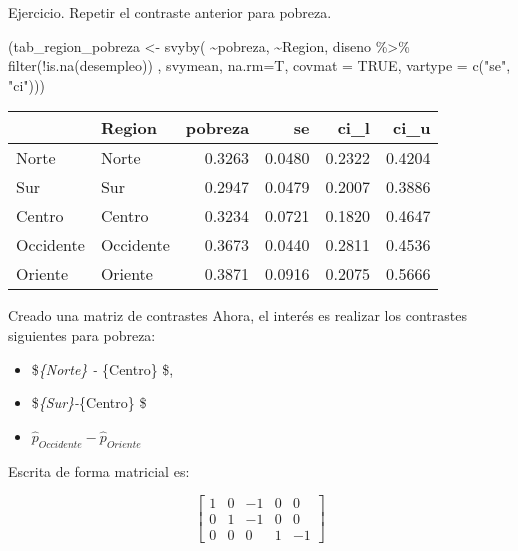 \documentclass[
  ignorenonframetext,
]{beamer}
\newenvironment{Shaded}{\begin{snugshade}}{\end{snugshade}}
\newcommand{\AttributeTok}[1]{\textcolor[rgb]{0.77,0.63,0.00}{#1}}
\newcommand{\ConstantTok}[1]{\textcolor[rgb]{0.00,0.00,0.00}{#1}}
\newcommand{\FunctionTok}[1]{\textcolor[rgb]{0.00,0.00,0.00}{#1}}
\newcommand{\NormalTok}[1]{#1}
\newcommand{\OtherTok}[1]{\textcolor[rgb]{0.56,0.35,0.01}{#1}}
\newcommand{\SpecialCharTok}[1]{\textcolor[rgb]{0.00,0.00,0.00}{#1}}
\newcommand{\StringTok}[1]{\textcolor[rgb]{0.31,0.60,0.02}{#1}}
\providecommand{\tightlist}{%
  \setlength{\itemsep}{0pt}\setlength{\parskip}{0pt}}
\begin{document}
\begin{frame}[fragile]{Ejercicio.}
\protect\hypertarget{ejercicio.}{}
Repetir el contraste anterior para pobreza.

\begin{Shaded}
\begin{Highlighting}[]
\NormalTok{(tab\_region\_pobreza }\OtherTok{\textless{}{-}} \FunctionTok{svyby}\NormalTok{(}
  \SpecialCharTok{\textasciitilde{}}\NormalTok{pobreza, }\SpecialCharTok{\textasciitilde{}}\NormalTok{Region, }
\NormalTok{    diseno }\SpecialCharTok{\%\textgreater{}\%} \FunctionTok{filter}\NormalTok{(}\SpecialCharTok{!}\FunctionTok{is.na}\NormalTok{(desempleo)) , }
\NormalTok{     svymean, }\AttributeTok{na.rm=}\NormalTok{T, }\AttributeTok{covmat =} \ConstantTok{TRUE}\NormalTok{,}
      \AttributeTok{vartype =} \FunctionTok{c}\NormalTok{(}\StringTok{"se"}\NormalTok{, }\StringTok{"ci"}\NormalTok{)))}
\end{Highlighting}
\end{Shaded}

\begin{tabular}{l|l|r|r|r|r}
\hline
  & Region & pobreza & se & ci\_l & ci\_u\\
\hline
Norte & Norte & 0.3263 & 0.0480 & 0.2322 & 0.4204\\
\hline
Sur & Sur & 0.2947 & 0.0479 & 0.2007 & 0.3886\\
\hline
Centro & Centro & 0.3234 & 0.0721 & 0.1820 & 0.4647\\
\hline
Occidente & Occidente & 0.3673 & 0.0440 & 0.2811 & 0.4536\\
\hline
Oriente & Oriente & 0.3871 & 0.0916 & 0.2075 & 0.5666\\
\hline
\end{tabular}
\end{frame}

\begin{frame}{Creado una matriz de contrastes}
\protect\hypertarget{creado-una-matriz-de-contrastes-1}{}
Ahora, el interés es realizar los contrastes siguientes para pobreza:

\begin{itemize}[<+->]
\tightlist
\item
  \$\emph{\{Norte\} - }\{Centro\} \$,
\item
  \$\emph{\{Sur\}-}\{Centro\} \$\\
\item
  \(\hat{p}_{Occidente}-\hat{p}_{Oriente}\)
\end{itemize}

Escrita de forma matricial es:

\[
\left[\begin{array}{ccccc}
1 & 0 & -1 & 0 & 0\\
0 & 1 & -1 & 0 & 0\\
0 & 0 & 0 & 1 & -1
\end{array}\right]
\]
\end{frame}
\end{document}
